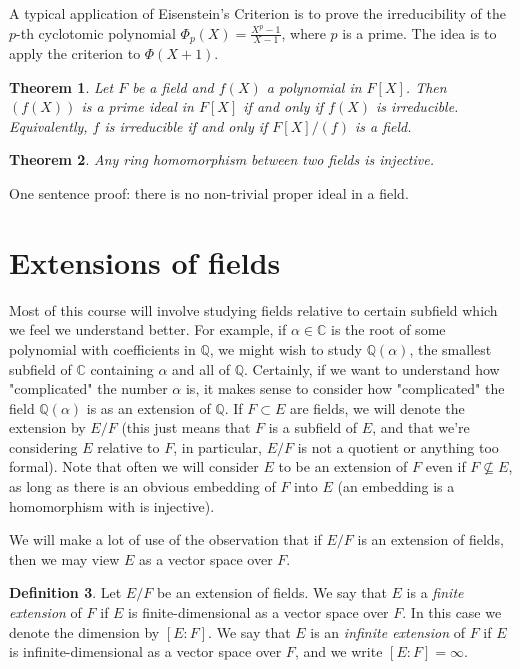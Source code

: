 \documentclass[12pt]{report}
\newtheorem{thm}{Theorem}[section]
\theoremstyle{definition}
\newtheorem{defn}[thm]{Definition}
\def\CC{\mathbb{C}}
\def\QQ{\mathbb{Q}}
\begin{document}
A typical application of Eisenstein's Criterion is to prove the irreducibility of the $p$-th cyclotomic polynomial $\Phi_p(X) = \frac{X^p-1}{X-1}$, where $p$ is a prime. The idea is to apply the criterion to $\Phi(X+1)$.

\begin{thm}
    Let $F$ be a field and $f(X)$ a polynomial in $F[X]$. Then $(f(X))$ is a prime ideal in $F[X]$ if and only if $f(X)$ is irreducible. Equivalently, $f$ is irreducible if and only if $F[X]/(f)$ is a field.
\end{thm}

\begin{thm}
    Any ring homomorphism between two fields is injective.
\end{thm}

\noindent One sentence proof: there is no non-trivial proper ideal in a field.

\section{Extensions of fields}

Most of this course will involve studying fields relative to certain subfield which we feel we understand better. For example, if $\alpha\in\CC$ is the root of some polynomial with coefficients in $\QQ$, we might wish to study $\QQ(\alpha)$, the smallest subfield of $\CC$ containing $\alpha$ and all of $\QQ$. Certainly, if we want to understand how "complicated" the number $\alpha$ is, it makes sense to consider how "complicated" the field $\QQ(\alpha)$ is as an extension of $\QQ$. If $F \subset E$ are fields, we will denote the extension by $E/F$ (this just means that $F$ is a subfield of $E$, and that we're considering $E$ relative to $F$, in particular, $E/F$ is not a quotient or anything too formal). Note that often we will consider $E$ to be an extension of $F$ even if $F\nsubseteq E$, as long as there is an obvious embedding of $F$ into $E$ (an embedding is a homomorphism with is injective). 

We will make a lot of use of the observation that if $E/F$ is an extension
of fields, then we may view $E$ as a vector space over $F$.

\begin{defn}
    Let $E/F$ be an extension of fields. We say that $E$ is a \emph{finite extension} of $F$ if $E$ is finite-dimensional as a vector space over $F$. In this case we denote the dimension by $[E:F]$. We say that $E$ is an \emph{infinite extension} of $F$ if $E$ is infinite-dimensional as a vector space over $F$, and we write $[E:F] = \infty$.
\end{defn}
\end{document}
